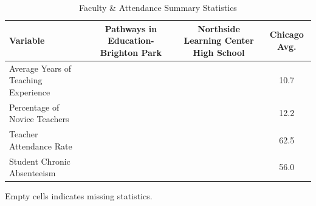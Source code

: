\begin{table}[H]
\renewcommand{\arraystretch}{1.5}
\caption*{
{\large Faculty \& Attendance Summary Statistics}
} 

\fontsize{10pt}{11pt}\selectfont

\begin{tabular*}{\linewidth}{@{\extracolsep{\fill}}lccc}
\toprule
Variable & Pathways in Education- Brighton Park & Northside Learning Center High School & Chicago Avg. \\ 
\midrule\addlinespace[2.5pt]
Average Years of Teaching Experience &  &  & 10.7 \\
Percentage of Novice Teachers &  &  & 12.2 \\
Teacher Attendance Rate &  &  & 62.5 \\
Student Chronic Absenteeism &  &  & 56.0 \\
\bottomrule
\end{tabular*}
\begin{minipage}{\linewidth}
Empty cells indicates missing statistics.\\
\end{minipage}
\end{table}
